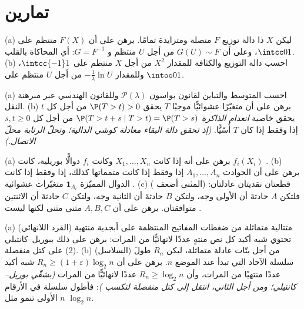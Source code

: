 \section{تمارين}

\begin{exercise}[$\star$]\label{exo:b3:probability:1}
(a) ليكن $X$ ذا دالة توزيع $F$ متصلة ومتزايدة تمامًا. برهن على
أن $F(X)$ منتظم على $\intcc01$، وعلى أن $G(U) \sim F$ من أجل
$U$ منتظم و $G = F^{-1}$: أي المحاكاة بالقلب.
(b) احسب دالة التوزيع والكثافة للمقدار $X^2$ من أجل $X$ منتظم
على $\intcc{-1}1$، وللمقدار $-\frac1\lambda\ln
U$ من أجل $U$ منتظم على
$\intoo01$.
\end{exercise}

\begin{exercise}[$\star$]\label{exo:b3:probability:2}
(a) احسب المتوسط والتباين لقانون بواسون $\mathcal
P(\lambda)$ وللقانون
الهندسي عبر مبرهنة النقل.
(b) برهن على أن متغيّرًا عشوائيًّا موجبًا $T$ يحقق $\P(T > t)
> 0$ من
أجل كل $t$ يحقق خاصية \emph{انعدام الذاكرة} $\P(T > t + s \mid
T > t) = \P(T > s)$ من أجل كل
$s, t \geq 0$ إذا وفقط إذا كان $T$ أُسّيًّا. \emph{(إذ تحقق
دالة البقاء معادلة كوشي الدالية؛ وتحلّ الرتابة محلّ الاتصال.)}
\end{exercise}

\begin{exercise}[$\star\star$]\label{exo:b3:probability:3}
(a) برهن على أنه إذا كانت $X_1, \dots, X_n$  وكانت $f_i$ دوالًّا
بوريلية، كانت $f_i(X_i)$ .
(b) برهن على أن الحوادث $A_1, \dots, A_n$  إذا وفقط إذا كانت
متمماتها كذلك، إذا وفقط إذا كانت الدوال المميّزة $\mathbf 1_{A_i}$
متغيّرات عشوائية .
(c) ( المثنى أضعف) قطعتان نقديتان عادلتان: فلتكن $A$ حادثةَ
أن الأولى وجه، ولتكن $B$ حادثةَ أن الثانية وجه، ولتكن $C$
حادثةَ أن الاثنتين متوافقتان. برهن على أن $A, B, C$  مثنى مثنى لكنها ليست
.
\end{exercise}

\begin{exercise}[$\star\star$]\label{exo:b3:probability:4}
(a) (القرد اللانهائي) متتالية  متماثلة من ضغطات المفاتيح
المنتظمة على أبجدية منتهية تحتوي شبه أكيد كل نص منتهٍ عددًا
لانهائيًّا من المرات: برهن على ذلك ببوريل--كانتيلي (2) على كتل
منفصلة.
(b) (السلاسل) من أجل بتّات عادلة  متماثلة، ليكن $R_n$
طولَ سلسلة الآحاد التي تبدأ عند الموضع $n$. برهن على أن
$R_n \geq (1+\varepsilon)\log_2n$ شبه أكيد عددًا منتهيًا من المرات، وأن $R_n
\geq \log_2 n$ عددًا
لانهائيًّا من المرات \emph{(بشقّي بوريل--كانتيلي؛ ومن أجل
الثاني، انتقل إلى كتل منفصلة لتكسب )}: فأطول سلسلة في
الأرقام $n$ الأولى تنمو مثل $\log_2n$.
\end{exercise}

